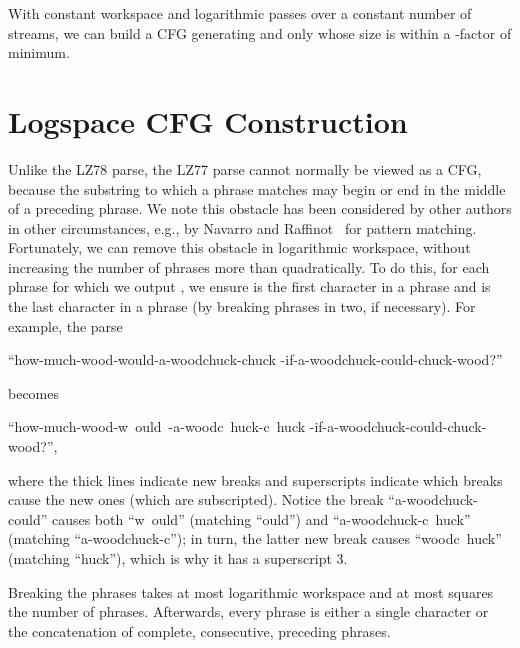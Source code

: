 \documentclass[runningheads]{llncs}
\begin{document}
\begin{theorem}
With constant workspace and logarithmic passes over a constant number of streams, we can build a CFG generating  and only  whose size is within a -factor of minimum.
\end{theorem}

\section{Logspace CFG Construction} \label{sec:grammar}

Unlike the LZ78 parse, the LZ77 parse cannot normally be viewed as a CFG, because the substring to which a phrase matches may begin or end in the middle of a preceding phrase.  We note this obstacle has been considered by other authors in other circumstances, e.g., by Navarro and Raffinot~\cite{NR04} for pattern matching.  Fortunately, we can remove this obstacle in logarithmic workspace, without increasing the number of phrases more than quadratically.  To do this, for each phrase for which we output , we ensure  is the first character in a phrase and  is the last character in a phrase (by breaking phrases in two, if necessary).  For example, the parse
\begin{center}
``{\sf how-much-wood-would-a-woodchuck-chuck
\linebreak
-if-a-woodchuck-could-chuck-wood?}''
\end{center}
becomes
\begin{center}
``{\sf how-much-wood-w\ \raisebox{-.6ex}{\rule{.3ex}{2.5ex}}ould\ \raisebox{-.6ex}{\rule{.3ex}{2.5ex}}-a-woodc\ \raisebox{-.6ex}{\rule{.3ex}{2.5ex}}huck-c\ \raisebox{-.6ex}{\rule{.3ex}{2.5ex}}huck
\linebreak
-if-a-woodchuck-could-chuck-wood?}'',
\end{center}
where the thick lines indicate new breaks and superscripts indicate which breaks cause the new ones (which are subscripted).  Notice the break ``{\sf a-woodchuck-could}'' causes both ``{\sf w\ \raisebox{-.6ex}{\rule{.3ex}{2.5ex}}ould}'' (matching ``{\sf ould}'') and ``{\sf a-woodchuck-c\ \raisebox{-.6ex}{\rule{.3ex}{2.5ex}}huck}'' (matching ``{\sf a-woodchuck-c}''); in turn, the latter new break causes ``{\sf woodc\ \raisebox{-.6ex}{\rule{.3ex}{2.5ex}}huck}'' (matching ``{\sf huck}''), which is why it has a superscript 3.

\begin{lemma} \label{lem:breaks}
Breaking the phrases takes at most logarithmic workspace and at most squares the number of phrases.  Afterwards, every phrase is either a single character or the concatenation of complete, consecutive, preceding phrases.
\end{lemma}
\end{document}
